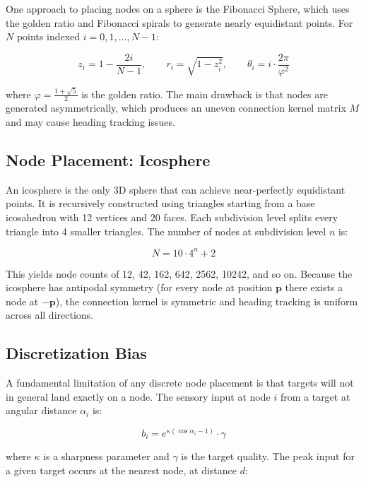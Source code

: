 \documentclass[12pt, letterpaper]{article}
\begin{document}
One approach to placing nodes on a sphere is the Fibonacci Sphere, which uses the golden ratio and Fibonacci spirals to generate nearly equidistant points. For $N$ points indexed $i = 0, 1, \ldots, N-1$:

\begin{equation}
    z_i = 1 - \frac{2i}{N-1}, \qquad r_i = \sqrt{1 - z_i^2}, \qquad \theta_i = i \cdot \frac{2\pi}{\varphi^2}
\end{equation}

where $\varphi = \frac{1+\sqrt{5}}{2}$ is the golden ratio. The main drawback is that nodes are generated asymmetrically, which produces an uneven connection kernel matrix $M$ and may cause heading tracking issues.

\subsection{Node Placement: Icosphere}

An icosphere is the only 3D sphere that can achieve near-perfectly equidistant points. It is recursively constructed using triangles starting from a base icosahedron with 12 vertices and 20 faces. Each subdivision level splits every triangle into 4 smaller triangles. The number of nodes at subdivision level $n$ is:

\begin{equation}
    N = 10 \cdot 4^n + 2
\end{equation}

This yields node counts of 12, 42, 162, 642, 2562, 10242, and so on. Because the icosphere has antipodal symmetry (for every node at position $\mathbf{p}$ there exists a node at $-\mathbf{p}$), the connection kernel is symmetric and heading tracking is uniform across all directions.

\subsection{Discretization Bias}

A fundamental limitation of any discrete node placement is that targets will not in general land exactly on a node. The sensory input at node $i$ from a target at angular distance $\alpha_i$ is:

\begin{equation}
    b_i = e^{\kappa(\cos \alpha_i - 1)} \cdot \gamma
\end{equation}

where $\kappa$ is a sharpness parameter and $\gamma$ is the target quality. The peak input for a given target occurs at the nearest node, at distance $d$:
\end{document}
